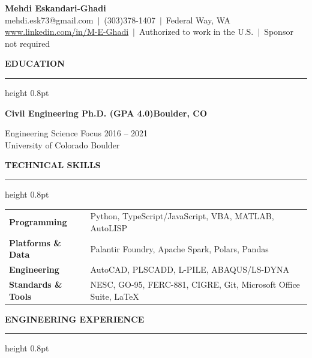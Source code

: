 \documentclass[10pt, letterpaper]{article}
\newcommand{\rsection}[1]{%
  \vspace{8pt}%
  {\large\bfseries\MakeUppercase{#1}}%
  \vspace{1pt}%
  \hrule height 0.8pt%
  \vspace{4pt}%
}
\newcommand{\jobline}[2]{%
  \vspace{5pt}%
  \noindent\textbf{#1}\hfill\textbf{#2}\par%
  \vspace{1pt}%
}
\begin{document}
\pagestyle{empty}

\begin{center}
  {\LARGE\bfseries Mehdi Eskandari-Ghadi}\\[4pt]
  mehdi.esk73@gmail.com\ $|$\ (303)378-1407\ $|$\ Federal Way, WA\\[2pt]
  \href{http://www.linkedin.com/in/M-E-Ghadi}{www.linkedin.com/in/M-E-Ghadi}\ $|$\
  Authorized to work in the U.S.\ $|$\ Sponsor not required
\end{center}

\vspace{2pt}

\rsection{Education}

\jobline{Civil Engineering Ph.D. (GPA 4.0)}{Boulder, CO}
Engineering Science Focus \hfill 2016 -- 2021\\
University of Colorado Boulder

\rsection{Technical Skills}

\vspace{2pt}
\begin{tabular}{@{}p{4cm}p{13cm}@{}}
  \textbf{Programming}       & Python, TypeScript/JavaScript, VBA, MATLAB, AutoLISP \\[2pt]
  \textbf{Platforms \& Data} & Palantir Foundry, Apache Spark, Polars, Pandas \\[2pt]
  \textbf{Engineering}       & AutoCAD, PLSCADD, L-PILE, ABAQUS/LS-DYNA \\[2pt]
  \textbf{Standards \& Tools} & NESC, GO-95, FERC-881, CIGRE, Git, Microsoft Office Suite, LaTeX \\
\end{tabular}

\rsection{Engineering Experience}
\end{document}
